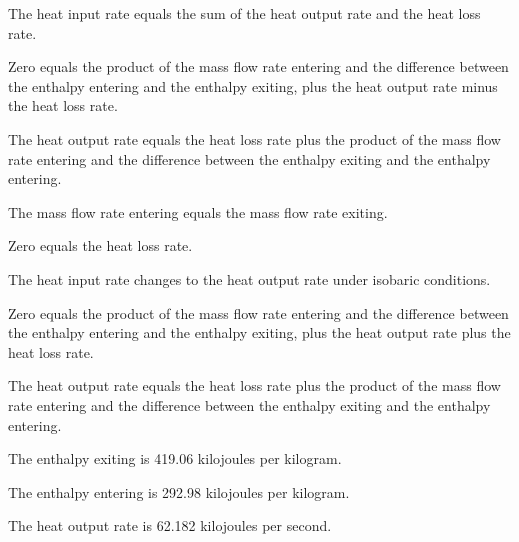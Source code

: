 The heat input rate equals the sum of the heat output rate and the heat loss rate.

Zero equals the product of the mass flow rate entering and the difference between the enthalpy entering and the enthalpy exiting, plus the heat output rate minus the heat loss rate.

The heat output rate equals the heat loss rate plus the product of the mass flow rate entering and the difference between the enthalpy exiting and the enthalpy entering.

The mass flow rate entering equals the mass flow rate exiting.

Zero equals the heat loss rate.

The heat input rate changes to the heat output rate under isobaric conditions.

Zero equals the product of the mass flow rate entering and the difference between the enthalpy entering and the enthalpy exiting, plus the heat output rate plus the heat loss rate.

The heat output rate equals the heat loss rate plus the product of the mass flow rate entering and the difference between the enthalpy exiting and the enthalpy entering.

The enthalpy exiting is 419.06 kilojoules per kilogram.

The enthalpy entering is 292.98 kilojoules per kilogram.

The heat output rate is 62.182 kilojoules per second.
